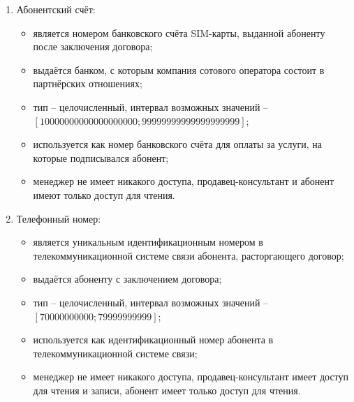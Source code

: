 \begin{enumerate}
\begin{enumerate}
        \item Абонентский счёт:
        \begin{itemize}
            \item является номером банковского счёта SIM-карты, выданной абоненту после заключения договора;
            \item выдаётся банком, с которым компания сотового оператора состоит в партнёрских отношениях;
            \item тип -- целочисленный, интервал возможных значений -- $[10000000000000000000; 99999999999999999999]$;
            \item используется как номер банковского счёта для оплаты за услуги, на которые подписывался абонент;
            \item менеджер не имеет никакого доступа, продавец-консультант и абонент имеют только доступ для чтения.
        \end{itemize}

        \item Телефонный номер:
        \begin{itemize}
            \item является уникальным идентификационным номером в телекоммуникационной системе связи абонента, расторгающего договор;
            \item выдаётся абоненту с заключением договора;
            \item тип -- целочисленный, интервал возможных значений -- $[70000000000; 79999999999]$;
            \item используется как идентификационный номер абонента в телекоммуникационной системе связи;
            \item менеджер не имеет никакого доступа, продавец-консультант имеет доступ для чтения и записи, абонент имеет только доступ для чтения.
        \end{itemize}


\end{enumerate}
\end{enumerate}
